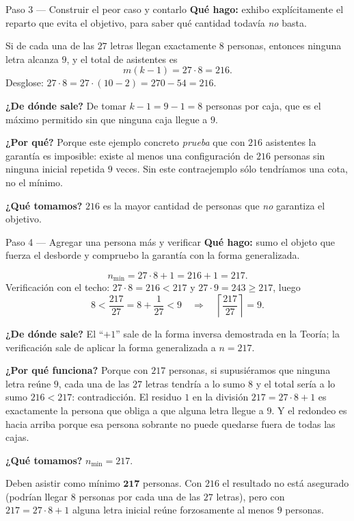 \documentclass[11pt]{article}
\begin{document}
\begin{paso}{Paso 3 --- Construir el peor caso y contarlo}
\textbf{Qué hago:} exhibo explícitamente el reparto que evita el objetivo, para saber qué cantidad todavía \emph{no} basta.

Si de cada una de las $27$ letras llegan exactamente $8$ personas, entonces ninguna letra alcanza $9$, y el total de asistentes es
\[
m(k-1)=27\cdot 8 = 216 .
\]
Desglose: $27\cdot 8 = 27\cdot(10-2)=270-54=216$.

\textbf{¿De dónde sale?} De tomar $k-1=9-1=8$ personas por caja, que es el máximo permitido sin que ninguna caja llegue a $9$.

\textbf{¿Por qué?} Porque este ejemplo concreto \emph{prueba} que con $216$ asistentes la garantía es imposible: existe al menos una configuración de $216$ personas sin ninguna inicial repetida $9$ veces. Sin este contraejemplo sólo tendríamos una cota, no el mínimo.

\textbf{¿Qué tomamos?} $216$ es la mayor cantidad de personas que \emph{no} garantiza el objetivo.
\end{paso}

\begin{paso}{Paso 4 --- Agregar una persona más y verificar}
\textbf{Qué hago:} sumo el objeto que fuerza el desborde y compruebo la garantía con la forma generalizada.

\[
n_{\min}=27\cdot 8+1 = 216+1 = 217 .
\]
Verificación con el techo: $27\cdot 8=216<217$ y $27\cdot 9=243\ge 217$, luego
\[
8<\frac{217}{27}=8+\frac{1}{27}<9 \quad\Longrightarrow\quad \left\lceil \frac{217}{27} \right\rceil = 9 .
\]

\textbf{¿De dónde sale?} El ``$+1$'' sale de la forma inversa demostrada en la Teoría; la verificación sale de aplicar la forma generalizada a $n=217$.

\textbf{¿Por qué funciona?} Porque con $217$ personas, si supusiéramos que ninguna letra reúne $9$, cada una de las $27$ letras tendría a lo sumo $8$ y el total sería a lo sumo $216<217$: contradicción. El residuo $1$ en la división $217=27\cdot 8+1$ es exactamente la persona que obliga a que alguna letra llegue a $9$. Y el redondeo es hacia arriba porque esa persona sobrante no puede quedarse fuera de todas las cajas.

\textbf{¿Qué tomamos?} $n_{\min}=217$.
\end{paso}

\begin{resp}
Deben asistir como mínimo $\mathbf{217}$ personas. Con $216$ el resultado no está asegurado (podrían llegar $8$ personas por cada una de las $27$ letras), pero con $217=27\cdot 8+1$ alguna letra inicial reúne forzosamente al menos $9$ personas.
\end{resp}
\end{document}
